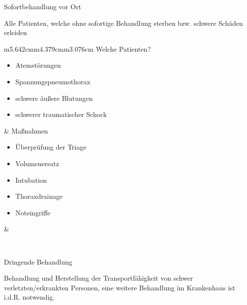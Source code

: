 \documentclass{article}
\begin{document}
Sofortbehandlung vor Ort

Alle Patienten, welche ohne sofortige Behandlung sterben bzw. schwere
Sch\"aden erleiden

\begin{flushleft}
\tablehead{}\begin{supertabular}{m{5.642cm}m{4.379cm}m{3.076cm}}
Welche Patienten?

\begin{itemize}
\item Atemst\"orungen

\item Spannungspneumothorax

\item schwere \"au{\ss}ere Blutungen

\item schwerer traumatischer Schock

\end{itemize}
 &
Ma{\ss}nahmen

\begin{itemize}
\item \"Uberpr\"ufung der Triage

\item Volumenersatz

\item Intubation

\item Thoraxdrainage

\item Noteingriffe

\end{itemize}
 &
 \par

\\
\end{supertabular}
\end{flushleft}
Dringende Behandlung

Behandlung und Herstellung der Transportf\"ahigkeit von schwer
verletzten/erkrankten Personen, eine weitere Behandlung im Krankenhaus
ist i.d.R. notwendig.
\end{document}
